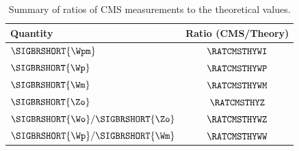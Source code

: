 \begin{table} %
\begin{center}
\caption[.]{ Summary of ratios of CMS measurements to the theoretical values. }
\begin{tabular}{|l|c|}
\hline
Quantity & Ratio (CMS/Theory) \\
\hline
$\SIGBRSHORT{\Wpm}$   & $\RATCMSTHYWI$ \\
$\SIGBRSHORT{\Wp}$     & $\RATCMSTHYWP$ \\
$\SIGBRSHORT{\Wm}$     & $\RATCMSTHYWM$ \\
$\SIGBRSHORT{\Zo}$       & $\RATCMSTHYZ$  \\
$\SIGBRSHORT{\Wo}/\SIGBRSHORT{\Zo}$     & $\RATCMSTHYWZ$ \\
$\SIGBRSHORT{\Wp}/\SIGBRSHORT{\Wm}$ & $\RATCMSTHYWW$ \\
\hline
\end{tabular}
\label{tab:RatioCMSTHY}
\end{center}
\end{table}


